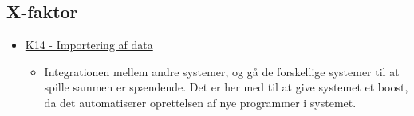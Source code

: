 \subsection{X-faktor}
\begin{itemize}
    \item \hyperref[table:funktionskrav]{K14 - Importering af data} 
    \begin{itemize}
        \item Integrationen mellem andre systemer, og gå de forskellige systemer til at spille sammen er spændende. Det er her med til at give systemet et boost, da det automatiserer oprettelsen af nye programmer i systemet.
    \end{itemize}{}
\end{itemize}
